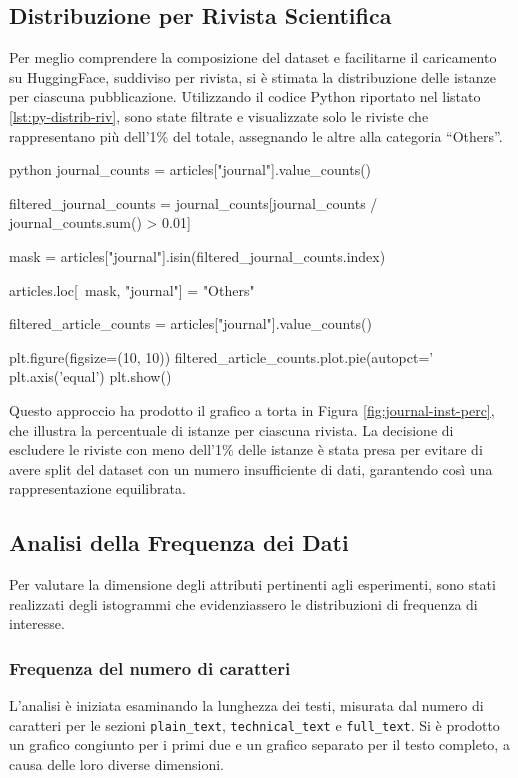 \documentclass[12pt,a4paper,twoside,openright]{book}
\begin{document}
\subsection{Distribuzione per Rivista Scientifica}
Per meglio comprendere la composizione del dataset e facilitarne il caricamento su HuggingFace, suddiviso per rivista, si è stimata la distribuzione delle istanze per ciascuna pubblicazione. Utilizzando il codice Python riportato nel listato \ref{lst:py-distrib-riv}, sono state filtrate e visualizzate solo le riviste che rappresentano più dell'1\% del totale, assegnando le altre alla categoria ``Others''.

\begin{customcode}
\begin{mintedbox}{python}
journal_counts = articles["journal"].value_counts()

filtered_journal_counts = journal_counts[journal_counts / journal_counts.sum() > 0.01]

mask = articles["journal"].isin(filtered_journal_counts.index)

articles.loc[~mask, "journal"] = "Others"

filtered_article_counts = articles["journal"].value_counts()

plt.figure(figsize=(10, 10))
filtered_article_counts.plot.pie(autopct='%
plt.axis('equal')
plt.show()    
\end{mintedbox}
\caption{Codice Python per graficare la distribuzione delle riviste.}
\label{lst:py-distrib-riv}
\end{customcode}

Questo approccio ha prodotto il grafico a torta in Figura \ref{fig:journal-inst-perc}, che illustra la percentuale di istanze per ciascuna rivista. La decisione di escludere le riviste con meno dell'1\% delle istanze è stata presa per evitare di avere split del dataset con un numero insufficiente di dati, garantendo così una rappresentazione equilibrata.


\subsection{Analisi della Frequenza dei Dati}
Per valutare la dimensione degli attributi pertinenti agli esperimenti, sono stati realizzati degli istogrammi che evidenziassero le distribuzioni di frequenza di interesse.

\subsubsection{Frequenza del numero di caratteri}
L'analisi è iniziata esaminando la lunghezza dei testi, misurata dal numero di caratteri per le sezioni \texttt{plain\_text}, \texttt{technical\_text} e \texttt{full\_text}. Si è prodotto un grafico congiunto per i primi due e un grafico separato per il testo completo, a causa delle loro diverse dimensioni.
\end{document}
